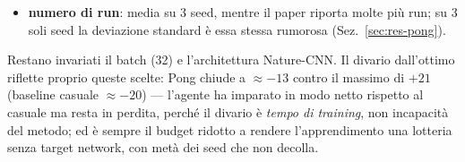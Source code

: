 \begin{itemize}
\begin{itemize}
                riscalata in proporzione al budget ridotto;
          \item \textbf{numero di run}: media su 3 seed, mentre il paper riporta molte
                pi\`u run; su 3 soli seed la deviazione standard \`e essa stessa rumorosa
                (Sez.~\ref{sec:res-pong}).
        \end{itemize}
        Restano invariati il batch (32) e l'architettura Nature-CNN. Il divario dall'ottimo
        riflette proprio queste scelte: Pong chiude a $\approx -13$ contro il massimo di
        $+21$ (baseline casuale $\approx -20$) --- l'agente ha imparato in modo netto
        rispetto al casuale ma resta in perdita, perch\'e il divario \`e \emph{tempo di
        training}, non incapacit\`a del metodo; ed \`e sempre il budget ridotto a rendere
        l'apprendimento una lotteria senza target network, con met\`a dei seed che non
        decolla.
\end{itemize}
